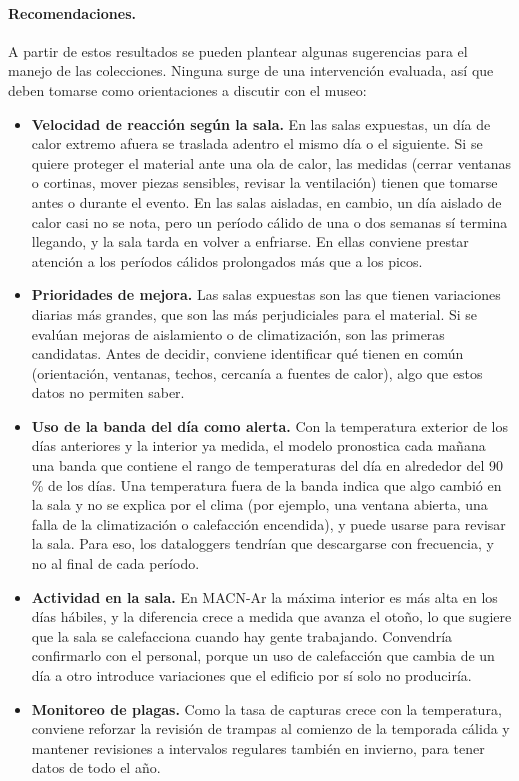 \documentclass[11pt,a4paper]{article}
\begin{document}
\paragraph{Recomendaciones.} A partir de estos resultados se pueden plantear algunas sugerencias para el manejo de las colecciones. Ninguna surge de una intervención evaluada, así que deben tomarse como orientaciones a discutir con el museo:
\begin{itemize}
    \item \textbf{Velocidad de reacción según la sala.} En las salas expuestas, un día de calor extremo afuera se traslada adentro el mismo día o el siguiente. Si se quiere proteger el material ante una ola de calor, las medidas (cerrar ventanas o cortinas, mover piezas sensibles, revisar la ventilación) tienen que tomarse antes o durante el evento. En las salas aisladas, en cambio, un día aislado de calor casi no se nota, pero un período cálido de una o dos semanas sí termina llegando, y la sala tarda en volver a enfriarse. En ellas conviene prestar atención a los períodos cálidos prolongados más que a los picos.
    \item \textbf{Prioridades de mejora.} Las salas expuestas son las que tienen variaciones diarias más grandes, que son las más perjudiciales para el material. Si se evalúan mejoras de aislamiento o de climatización, son las primeras candidatas. Antes de decidir, conviene identificar qué tienen en común (orientación, ventanas, techos, cercanía a fuentes de calor), algo que estos datos no permiten saber.
    \item \textbf{Uso de la banda del día como alerta.} Con la temperatura exterior de los días anteriores y la interior ya medida, el modelo pronostica cada mañana una banda que contiene el rango de temperaturas del día en alrededor del 90\,\% de los días. Una temperatura fuera de la banda indica que algo cambió en la sala y no se explica por el clima (por ejemplo, una ventana abierta, una falla de la climatización o calefacción encendida), y puede usarse para revisar la sala. Para eso, los dataloggers tendrían que descargarse con frecuencia, y no al final de cada período.
    \item \textbf{Actividad en la sala.} En MACN-Ar la máxima interior es más alta en los días hábiles, y la diferencia crece a medida que avanza el otoño, lo que sugiere que la sala se calefacciona cuando hay gente trabajando. Convendría confirmarlo con el personal, porque un uso de calefacción que cambia de un día a otro introduce variaciones que el edificio por sí solo no produciría.
    \item \textbf{Monitoreo de plagas.} Como la tasa de capturas crece con la temperatura, conviene reforzar la revisión de trampas al comienzo de la temporada cálida y mantener revisiones a intervalos regulares también en invierno, para tener datos de todo el año.
\end{itemize}
\end{document}
